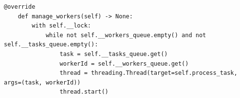 \lstset{style=python}
\begin{lstlisting}[caption = {Implementacja metody rozpoczynającej przetwarzanie zadania.}]
    @override
    def manage_workers(self) -> None:
        with self.__lock:
            while not self.__workers_queue.empty() and not self.__tasks_queue.empty():
                task = self.__tasks_queue.get()
                workerId = self.__workers_queue.get()
                thread = threading.Thread(target=self.process_task, args=(task, workerId))
                thread.start()
\end{lstlisting}